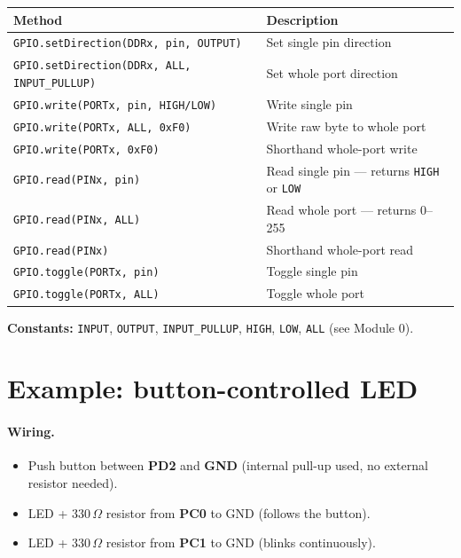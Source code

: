 \documentclass[11pt,a4paper]{article}
\begin{document}
\begin{center}
\small
\begin{tabular}{ll}
\toprule
\textbf{Method} & \textbf{Description} \\
\midrule
\texttt{GPIO.setDirection(DDRx, pin, OUTPUT)} & Set single pin direction \\
\texttt{GPIO.setDirection(DDRx, ALL, INPUT\_PULLUP)} & Set whole port direction \\
\texttt{GPIO.write(PORTx, pin, HIGH/LOW)} & Write single pin \\
\texttt{GPIO.write(PORTx, ALL, 0xF0)} & Write raw byte to whole port \\
\texttt{GPIO.write(PORTx, 0xF0)} & Shorthand whole-port write \\
\texttt{GPIO.read(PINx, pin)} & Read single pin --- returns \texttt{HIGH} or \texttt{LOW} \\
\texttt{GPIO.read(PINx, ALL)} & Read whole port --- returns 0--255 \\
\texttt{GPIO.read(PINx)} & Shorthand whole-port read \\
\texttt{GPIO.toggle(PORTx, pin)} & Toggle single pin \\
\texttt{GPIO.toggle(PORTx, ALL)} & Toggle whole port \\
\bottomrule
\end{tabular}
\end{center}

\textbf{Constants:} \texttt{INPUT}, \texttt{OUTPUT}, \texttt{INPUT\_PULLUP},
\texttt{HIGH}, \texttt{LOW}, \texttt{ALL} (see Module 0).

\section{Example: button-controlled LED}

\paragraph{Wiring.}
\begin{itemize}
  \item Push button between \textbf{PD2} and \textbf{GND} (internal pull-up used, no external resistor needed).
  \item LED + 330\,$\Omega$ resistor from \textbf{PC0} to GND (follows the button).
  \item LED + 330\,$\Omega$ resistor from \textbf{PC1} to GND (blinks continuously).
\end{itemize}
\end{document}
